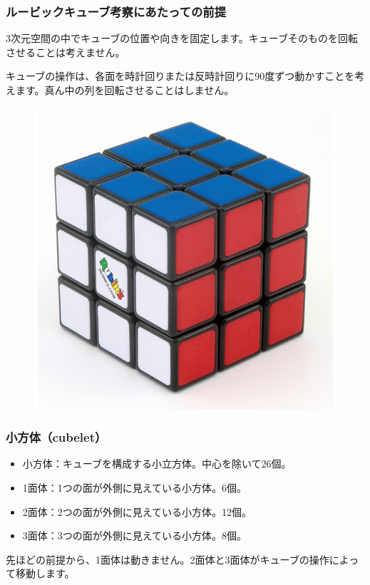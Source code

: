 \documentclass{beamer}
\begin{document}
\begin{frame}
    \frametitle{ルービックキューブ考察にあたっての前提}

    3次元空間の中でキューブの位置や向きを固定します。キューブそのものを回転させることは考えません。

    キューブの操作は、各面を時計回りまたは反時計回りに90度ずつ動かすことを考えます。真ん中の列を回転させることはしません。

    \begin{figure}
        \includegraphics[scale=0.2]{images/rubik3.jpg}
    \end{figure}
\end{frame}

\begin{frame}
    \frametitle{小方体（cubelet）}

    \begin{itemize}
        \item 小方体：キューブを構成する小立方体。中心を除いて26個。
        \item 1面体：1つの面が外側に見えている小方体。6個。
        \item 2面体：2つの面が外側に見えている小方体。12個。
        \item 3面体：3つの面が外側に見えている小方体。8個。
    \end{itemize}

    \bigskip

    先ほどの前提から、1面体は動きません。2面体と3面体がキューブの操作によって移動します。
\end{frame}
\end{document}
